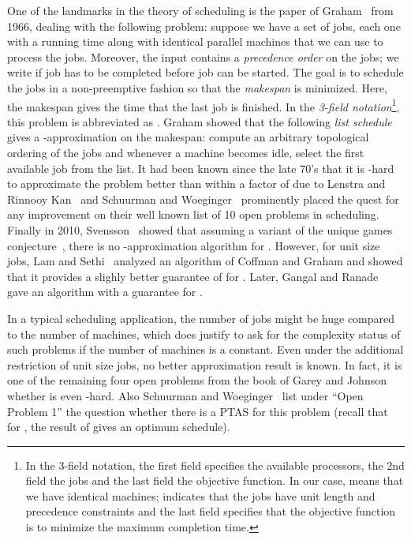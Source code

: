 \documentclass[11pt,letterpaper,oneside,english]{article}
\theoremstyle{theorem}
\begin{document}
One of the landmarks in the theory of scheduling is the paper of Graham~\cite{Graham66} from 1966,
dealing with the following problem: suppose we have a set  of  jobs, each one
with a running time  along with  identical parallel machines that we can use to
process the jobs. Moreover, the input contains a \emph{precedence order} 
on the jobs; we write  if job  has to be completed before job 
can be started. The goal is to schedule the jobs in a non-preemptive fashion so that the
\emph{makespan} is minimized. Here, the makespan gives the time that the last job is finished.
In the \emph{3-field notation}\footnote{In the 3-field notation, the first field specifies the available processors, the 2nd field the jobs and the last field the objective function. In our case,  means that we 
have  identical machines;  indicates that the jobs have unit length and precedence constraints and the last field  specifies that the objective function is to minimize the maximum completion time.}, this problem is abbreviated as . Graham showed that the following \emph{list schedule} gives a -approximation on the makespan: compute an arbitrary topological ordering of the jobs and whenever a machine becomes idle, select the first available job from the list. It had been known since the late 70's that it is -hard to approximate the problem better than within a factor of  due to Lenstra and Rinnooy Kan~\cite{ComplexityOfScheduling-Lenstra-RinnoyKan1978} and Schuurman and Woeginger~\cite{TenOpenProblems-SchuurmanWoeginger1991} prominently placed the quest for any improvement on their well known list of 10 open problems in scheduling. Finally in 2010, Svensson~\cite{HardnessPrecedenceScheduling-Svensson-STOC2010} showed that assuming a variant of the unique games conjecture~\cite{OptLongCodeTest-BansalKhot-FOCS09}, there is no -approximation algorithm for . 
However, for unit size jobs, Lam and Sethi~\cite{TwoSchedulingAlgorithms-Lam-Sethi-SICOMP77} analyzed an
algorithm of Coffman and Graham and showed that it provides a slighly better guarantee of   for . Later, Gangal and Ranade~\cite{PrecedenceConstrainedScheduling-GangalRanade2008} gave an algorithm with a  guarantee for . 
 

In a typical scheduling application, the number of jobs might be huge compared to the number of machines, 
which does justify to ask for the complexity status of such problems if the number  of machines
is a constant. Even under the additional restriction of unit size jobs, no better approximation result
is known. In fact, it is one of the remaining four open problems from the book of 
Garey and Johnson~\cite{GareyJohnson79}
whether  is even -hard. Also
Schuurman and Woeginger~\cite{TenOpenProblems-SchuurmanWoeginger1991} list under ``Open Problem 1'' the question whether there is a PTAS for this
problem (recall that for , the result of \cite{TwoSchedulingAlgorithms-Lam-Sethi-SICOMP77} gives an optimum schedule). 
\end{document}
